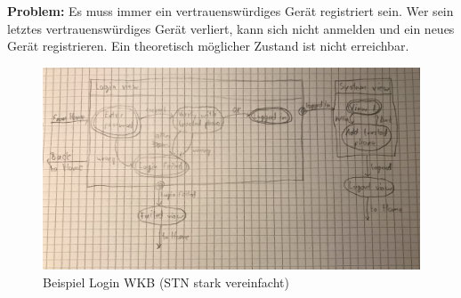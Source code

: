 %
\textbf{Problem:} Es muss immer ein vertrauenswürdiges Gerät registriert sein. 
Wer sein letztes vertrauenswürdiges Gerät verliert, kann sich nicht anmelden und ein neues Gerät registrieren. 
Ein theoretisch möglicher Zustand ist nicht erreichbar.
\begin{figure}[H]
  \includegraphics[width=\textwidth]{data/STN_Login.jpeg}
  \caption{Beispiel Login WKB (STN stark vereinfacht)}
\end{figure}